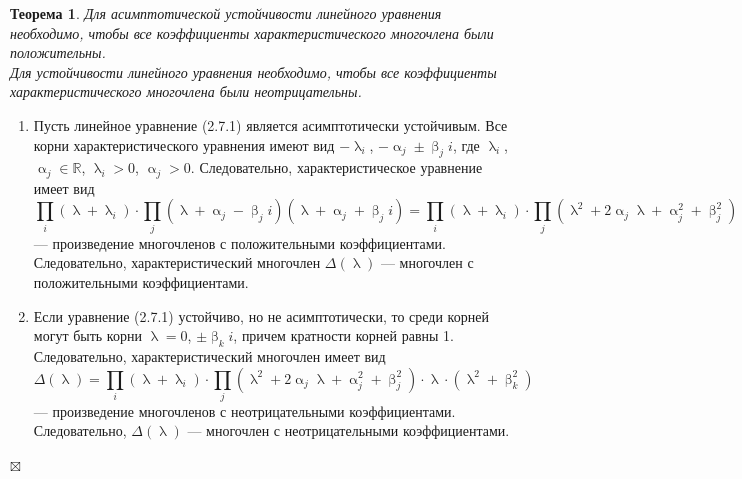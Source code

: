 \documentclass[a4paper, 12pt]{report}
\newenvironment{Proof} %
{\par\noindent{$\blacklozenge$}} %
{\hfill$\scriptstyle\boxtimes$}
\newcommand{\Rm}{\mathbb{R}}
\renewcommand{\alpha}{\upalpha}
\renewcommand{\beta}{\upbeta}
\renewcommand{\lambda}{\uplambda}
\newtheorem*{theorem}{Теорема}
\begin{document}
\begin{theorem}
	Для асимптотической устойчивости линейного уравнения необходимо, чтобы все коэффициенты характеристического многочлена были положительны.\\
	Для устойчивости линейного уравнения необходимо, чтобы все коэффициенты характеристического многочлена были неотрицательны.
\end{theorem}\begin{Proof}\begin{enumerate}
	\item Пусть линейное уравнение (2.7.1) является асимптотически устойчивым. Все корни характеристического уравнения имеют вид $-\lambda_i$, $-\alpha_j \pm \beta_j i$, где $\lambda_i$, $\alpha_j \in \Rm$, $\lambda_i > 0$, $\alpha_j > 0$. Следовательно, характеристическое уравнение имеет вид
	$$\prod_i (\lambda + \lambda_i)\cdot \prod_j(\lambda + \alpha_j - \beta_ji)(\lambda + \alpha_j + \beta_ji) = \prod_i (\lambda + \lambda_i)\cdot \prod_j(\lambda^2 + 2\alpha_j\lambda + \alpha_j^2 + \beta_j^2)$$
	--- произведение многочленов с положительными коэффициентами. Следовательно, характеристический многочлен $\Delta(\lambda)$ --- многочлен с положительными коэффициентами.
	\item Если уравнение (2.7.1) устойчиво, но не асимптотически, то среди корней могут быть корни $\lambda = 0$, $\pm \beta_k i$, причем кратности корней равны 1. Следовательно, характеристический многочлен имеет вид $$\Delta(\lambda) = \prod_i (\lambda + \lambda_i)\cdot \prod_j(\lambda^2 + 2\alpha_j\lambda + \alpha_j^2 + \beta_j^2)\cdot\lambda\cdot(\lambda^2 + \beta_k^2)$$
	--- произведение многочленов с неотрицательными коэффициентами. Следовательно, $\Delta(\lambda)$ --- многочлен с неотрицательными коэффициентами.
\end{enumerate}
\end{Proof}
\end{document}
